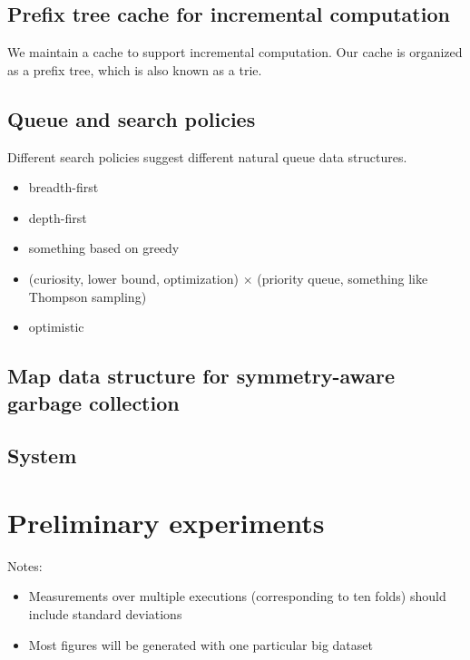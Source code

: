 \subsection{Prefix tree cache for incremental computation}
\label{sec:cache}

We maintain a cache to support incremental computation.
%
Our cache is organized as a prefix tree, which is also known as a trie.
%

\subsection{Queue and search policies}
\label{sec:queue}

Different search policies suggest different natural queue data structures.

\begin{itemize}
\item breadth-first
\item depth-first
\item something based on greedy
\item (curiosity, lower bound, optimization) $\times$ (priority queue, something like Thompson sampling)
\item optimistic
\end{itemize}

\subsection{Map data structure for symmetry-aware garbage collection}
\label{sec:map}


\subsection{System}
\label{sec:system}

\section{Preliminary experiments}
\label{sec:experiments}

Notes:
\begin{itemize}

\item Measurements over multiple executions (corresponding to ten folds)
should include standard deviations

\item Most figures will be generated with one particular big dataset
\end{itemize}

